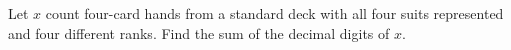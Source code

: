 Let $ x $ count four-card hands from a standard deck with all four suits represented and four different ranks. Find the sum of the decimal digits of $ x $.
